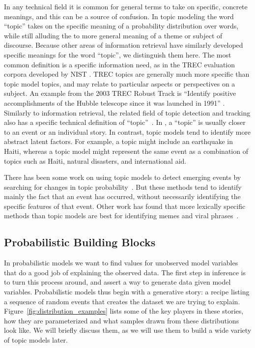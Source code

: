 In any technical field it is common for general terms to take on specific, concrete meanings, and this can be a source of confusion.
In topic modeling the word ``topic'' takes on the specific meaning of a probability distribution over words, while still alluding the to more general meaning of a theme or subject of discourse.
Because other areas of information retrieval have similarly developed
specific meanings for the word ``topic'', we distinguish them here.
The most common definition is a specific information need, as in the TREC evaluation corpora developed by NIST \citep{voorhees-05}.
TREC topics are generally much more specific than topic model topics, and may relate to particular aspects or perspectives on a subject.
An example from the 2003 TREC Robust Track is ``Identify positive accomplishments of the Hubble telescope since it was launched in 1991'' \citep{voorhees2003overview}.
Similarly to information retrieval, the related field of topic detection and tracking also has a specific technical definition of ``topic''~\citep{allan-02}.
In , a ``topic'' is usually closer to an event or an individual story.
In contrast, topic models tend to identify more abstract latent factors.
For example, a  topic might include an earthquake in Haiti, whereas a topic model might represent the same event as a combination of topics such as Haiti, natural disasters, and international aid.

There has been some work on using topic models to detect emerging events by searching for changes in topic probability~\citep{alsumait-08}.
But these methods tend to identify mainly the fact that an event has occurred, without necessarily identifying the specific features of that event.
Other work has found that more lexically specific methods than topic
models are best for identifying memes and viral
phrases~\citep{leskovec-09}. \\


\subsection{Probabilistic Building Blocks}
\label{sec:intro_building_blocks}

In probabilistic models we want to find values for unobserved model variables that do a good job of explaining the observed data.
The first step in inference is to turn this process around, and assert a way to generate data given model variables.
Probabilistic models thus begin with a generative story: a recipe listing a sequence of random events
that creates the dataset we are trying to explain.
Figure~\ref{fig:distribution_examples} lists some of the key players in these
stories, how they are parameterized and what samples drawn from these distributions look like.  We will
briefly discuss them, as we will use them to build a wide variety of topic models later.

